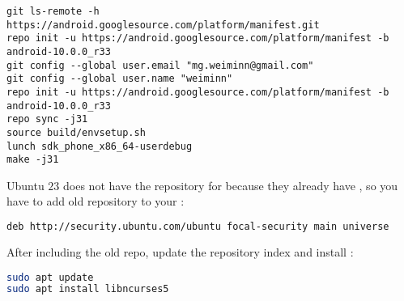 \begin{lstlisting}
git ls-remote -h https://android.googlesource.com/platform/manifest.git
repo init -u https://android.googlesource.com/platform/manifest -b android-10.0.0_r33
git config --global user.email "mg.weiminn@gmail.com"
git config --global user.name "weiminn"
repo init -u https://android.googlesource.com/platform/manifest -b android-10.0.0_r33
repo sync -j31
source build/envsetup.sh 
lunch sdk_phone_x86_64-userdebug 
make -j31
\end{lstlisting}

Ubuntu $23$ does not have the repository for  because they already have , so you have to add old  repository to your :
\begin{lstlisting}[language=bash]
deb http://security.ubuntu.com/ubuntu focal-security main universe
\end{lstlisting}

After including the old repo, update the repository index and install : 
\begin{lstlisting}[language=bash]
sudo apt update
sudo apt install libncurses5
\end{lstlisting}


